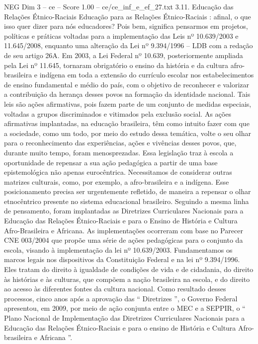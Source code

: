 \begin{textsample}{NEG Dim 3 – ce – Score 1.00 – ce/ce\_inf\_e\_ef\_27.txt}  \label{ex:f3_neg_237}
3.11.
Educação das Relações Étnico-Raciais Educação para as Relações Étnico-Raciais : afinal, o que isso quer dizer para nós educadores?
Pois bem, significa pensarmos em projetos, políticas e práticas voltadas para a implementação das Leis nº 10.639/2003 e 11.645/2008, enquanto uma alteração da Lei nº 9.394/1996 – LDB com a redação de seu artigo 26A.
Em 2003, a Lei Federal nº 10.639, posteriormente ampliada pela Lei nº 11.645, tornaram obrigatório o ensino da história e da cultura afro-brasileira e indígena em toda a extensão do currículo escolar nos estabelecimentos de ensino fundamental e médio do país, com o objetivo de reconhecer e valorizar a contribuição da herança desses povos na formação da identidade nacional.
Tais leis são ações afirmativas, pois fazem parte de um conjunto de medidas especiais, voltadas a grupos discriminados e vitimados pela exclusão social.
As ações afirmativas implantadas, na educação brasileira, têm como intuito fazer com que a sociedade, como um todo, por meio do estudo dessa temática, volte o seu olhar para o reconhecimento das experiências, ações e vivências desses povos, que, durante muito tempo, foram menosprezadas.
Essa legislação traz à escola a oportunidade de repensar a sua ação pedagógica a partir de uma base epistemológica não apenas eurocêntrica.
Necessitamos de considerar outras matrizes culturais, como, por exemplo, a afro-brasileira e a indígena.
Esse posicionamento precisa ser urgentemente refletido, de maneira a repensar o olhar etnocêntrico presente no sistema educacional brasileiro.
Seguindo a mesma linha de pensamento, foram implantadas as Diretrizes Curriculares Nacionais para a Educação das Relações Étnico-Raciais e para o Ensino de História e Cultura Afro-Brasileira e Africana.
As implementações ocorreram com base no Parecer CNE 003/2004 que propõe uma série de ações pedagógicas para o conjunto da escola, visando à implementação da lei nº 10.639/2003.
Fundamentamos os marcos legais nos dispositivos da Constituição Federal e na lei nº 9.394/1996.
Eles tratam do direito à igualdade de condições de vida e de cidadania, do direito às histórias e às culturas, que compõem a nação brasileira na escola, e do direito ao acesso às diferentes fontes da cultura nacional.
Como resultado desses processos, cinco anos após a aprovação das “ Diretrizes ”, o Governo Federal apresentou, em 2009, por meio de ação conjunta entre o MEC e a SEPPIR, o “ Plano Nacional de Implementação das Diretrizes Curriculares Nacionais para a Educação das Relações Étnico-Raciais e para o ensino de História e Cultura Afro-brasileira e Africana ”.

\end{textsample}
